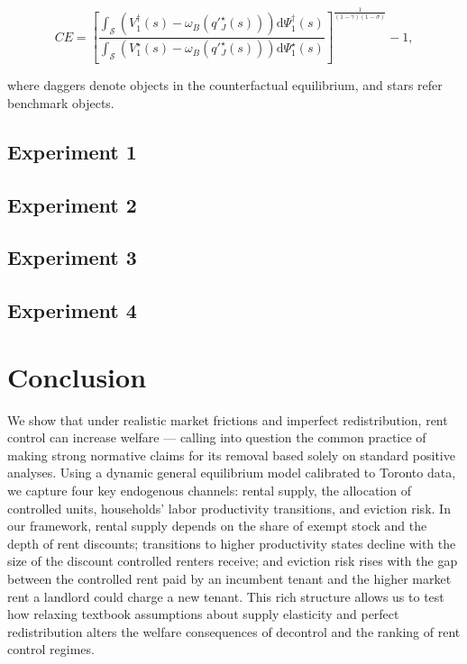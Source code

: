 \documentclass[parskip=full]{article}
\begin{document}
\begin{equation}
  CE = \left[\frac{\int_{\mathcal{S}}\left(V^{\dagger}_{1}(s)-\omega_{B}\left(q'^{\star}_{J}(s)\right)\right)\mathrm{d}\Psi^{\dagger}_{1}(s)}{\int_{\mathcal{S}}\left(V^{\star}_{1}(s)-\omega_{B}\left(q'^{\star}_{J}(s)\right)\right)\mathrm{d}\Psi^{\star}_{1}(s)}\right]^{\frac{1}{(1-\gamma)(1-\sigma)}}-1,
\end{equation}

\noindent where daggers denote objects in the counterfactual equilibrium, and stars refer benchmark objects. 

\subsection{Experiment 1}\label{sec:exp_1}

\subsection{Experiment 2}\label{sec:exp_2}

\subsection{Experiment 3}\label{sec:exp_3}

\subsection{Experiment 4}\label{sec:exp_4}

\section{Conclusion}\label{sec:conclusion}

We show that under realistic market frictions and imperfect redistribution, rent control can increase welfare — calling into question the common practice of making strong normative claims for its removal based solely on standard positive analyses. Using a dynamic general equilibrium model calibrated to Toronto data, we capture four key endogenous channels: rental supply, the allocation of controlled units, households’ labor productivity transitions, and eviction risk. In our framework, rental supply depends on the share of exempt stock and the depth of rent discounts; transitions to higher productivity states decline with the size of the discount controlled renters receive; and eviction risk rises with the gap between the controlled rent paid by an incumbent tenant and the higher market rent a landlord could charge a new tenant. This rich structure allows us to test how relaxing textbook assumptions about supply elasticity and perfect redistribution alters the welfare consequences of decontrol and the ranking of rent control regimes.
\end{document}
